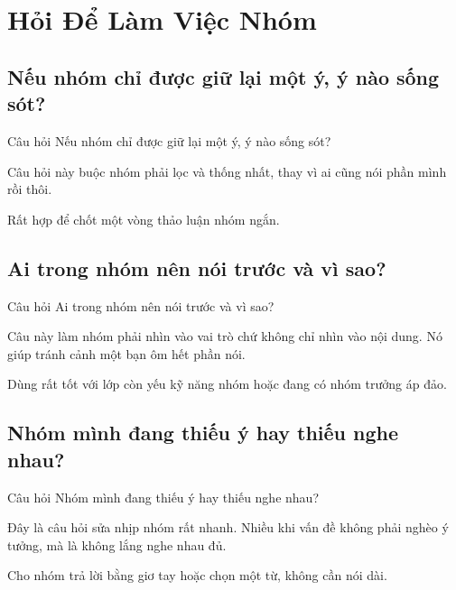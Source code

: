 \chapter{Hỏi Để Làm Việc Nhóm}

\section{Nếu nhóm chỉ được giữ lại một ý, ý nào sống sót?}
\begin{cauhoibox}{Câu hỏi}
Nếu nhóm chỉ được giữ lại một ý, ý nào sống sót?
\end{cauhoibox}
\begin{taisaocoich}
Câu hỏi này buộc nhóm phải lọc và thống nhất, thay vì ai cũng nói phần mình rồi thôi.
\end{taisaocoich}
\begin{goiybien}
Rất hợp để chốt một vòng thảo luận nhóm ngắn.
\end{goiybien}
\ngancach

\section{Ai trong nhóm nên nói trước và vì sao?}
\begin{cauhoibox}{Câu hỏi}
Ai trong nhóm nên nói trước và vì sao?
\end{cauhoibox}
\begin{taisaocoich}
Câu này làm nhóm phải nhìn vào vai trò chứ không chỉ nhìn vào nội dung. Nó giúp tránh cảnh một bạn ôm hết phần nói.
\end{taisaocoich}
\begin{goiybien}
Dùng rất tốt với lớp còn yếu kỹ năng nhóm hoặc đang có nhóm trưởng áp đảo.
\end{goiybien}
\ngancach

\section{Nhóm mình đang thiếu ý hay thiếu nghe nhau?}
\begin{cauhoibox}{Câu hỏi}
Nhóm mình đang thiếu ý hay thiếu nghe nhau?
\end{cauhoibox}
\begin{taisaocoich}
Đây là câu hỏi sửa nhịp nhóm rất nhanh. Nhiều khi vấn đề không phải nghèo ý tưởng, mà là không lắng nghe nhau đủ.
\end{taisaocoich}
\begin{goiybien}
Cho nhóm trả lời bằng giơ tay hoặc chọn một từ, không cần nói dài.
\end{goiybien}
\ngancach

